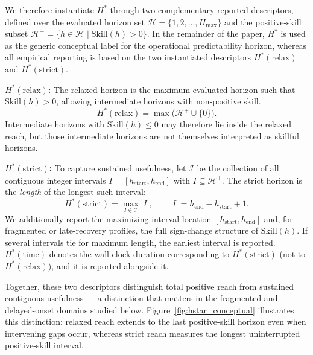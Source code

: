 \documentclass[pdflatex]{sn-jnl}
\begin{document}
We therefore instantiate $H^*$ through two complementary reported
descriptors, defined over the evaluated horizon set
$\mathcal{H} = \{1, 2, \dots, H_{\max}\}$ and the positive-skill
subset $\mathcal{H}^+ = \{h \in \mathcal{H} \mid \mathrm{Skill}(h) > 0\}$. In the remainder of the paper, $H^*$ is used as the generic conceptual label for the operational predictability horizon, whereas all empirical reporting is based on the two instantiated descriptors $H^*(\mathrm{relax})$ and $H^*(\mathrm{strict})$.



\textbf{$H^*(\mathrm{relax})$:} The relaxed horizon is the maximum
evaluated horizon such that $\mathrm{Skill}(h)>0$, allowing intermediate
horizons with non-positive skill.
\begin{equation}
  H^*(\mathrm{relax}) = \max\!\bigl(\mathcal{H}^+ \cup \{0\}\bigr).
\end{equation}
Intermediate horizons with $\mathrm{Skill}(h)\leq 0$ may therefore lie
inside the relaxed reach, but those intermediate horizons are not
themselves interpreted as skillful horizons.

\textbf{$H^*(\mathrm{strict})$:} To capture sustained usefulness, let
$\mathcal{I}$ be the collection of all contiguous integer intervals
$I=[h_{\mathrm{start}},h_{\mathrm{end}}]$ with $I\subseteq\mathcal{H}^+$.
The strict horizon is the \emph{length} of the longest such interval:
\begin{equation}
  H^*(\mathrm{strict}) = \max_{I\in\mathcal{I}} |I|,
  \qquad |I| = h_{\mathrm{end}} - h_{\mathrm{start}} + 1.
\end{equation}
We additionally report the maximizing interval location
$[h_{\mathrm{start}}, h_{\mathrm{end}}]$ and, for fragmented or
late-recovery profiles, the full sign-change structure of
$\mathrm{Skill}(h)$. If several intervals tie for maximum length, the
earliest interval is reported. $H^*(\mathrm{time})$ denotes the wall-clock
duration corresponding to $H^*(\mathrm{strict})$ (not to
$H^*(\mathrm{relax})$), and it is reported alongside it.

Together, these two descriptors distinguish total positive reach from
sustained contiguous usefulness — a distinction that matters in the
fragmented and delayed-onset domains studied below.
Figure~\ref{fig:hstar_conceptual} illustrates this distinction: relaxed
reach extends to the last positive-skill horizon even when intervening
gaps occur, whereas strict reach measures the longest uninterrupted
positive-skill interval.
\end{document}
